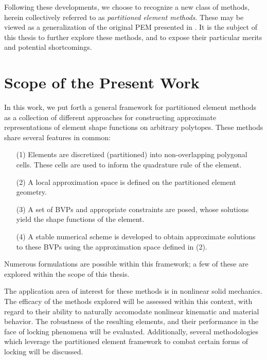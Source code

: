 	Following these developments, we choose to recognize a new class of methods, herein collectively referred to as \textit{partitioned element methods}. These may be viewed as a generalization of the original PEM presented in \cite{Rashid:12}. It is the subject of this thesis to further explore these methods, and to expose their particular merits and potential shortcomings.

\section{Scope of the Present Work}

	In this work, we put forth a general framework for partitioned element methods as a collection of different approaches for constructing approximate representations of element shape functions on arbitrary polytopes. These methods share several features in common:
	\begin{itemize}
		\item[(1)] Elements are discretized (partitioned) into non-overlapping polygonal cells. These cells are used to inform the quadrature rule of the element.
		\item[(2)] A local approximation space is defined on the partitioned element geometry.
		\item[(3)] A set of BVPs and appropriate constraints are posed, whose solutions yield the shape functions of the element.
		\item[(4)] A stable numerical scheme is developed to obtain approximate solutions to these BVPs using the approximation space defined in (2).
	\end{itemize}
	Numerous formulations are possible within this framework; a few of these are explored within the scope of this thesis.
	
	 The application area of interest for these methods is in nonlinear solid mechanics. The efficacy of the methods explored will be assessed within this context, with regard to their ability to naturally accomodate nonlinear kinematic and material behavior. The robustness of the resulting elements, and their performance in the face of locking phenomena will be evaluated. Additionally, several methodologies which leverage the partitioned element framework to combat certain forms of locking will be discussed.

